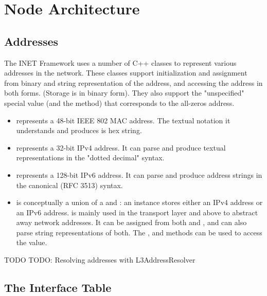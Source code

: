 \chapter{Node Architecture}
\label{cha:node-architecture}

\section{Addresses}

The INET Framework uses a number of C++ classes to represent various
addresses in the network. These classes support initialization and
assignment from binary and string representation of the address, and
accessing the address in both forms. (Storage is in binary form). They also
support the "unspecified" special value (and the 
method) that corresponds to the all-zeros address.

\begin{itemize}
  \item {} represents a 48-bit IEEE 802 MAC address. The
    textual notation it understands and produces is hex string.

  \item {} represents a 32-bit IPv4 address. It can parse
    and produce textual representations in the "dotted decimal" syntax.

  \item {} represents a 128-bit IPv6 address. It can parse
    and produce address strings in the canonical (RFC 3513) syntax.

  \item {} is conceptually a union of a 
    and : an instance stores either an IPv4 address or an
    IPv6 address.  is mainly used in the transport layer and above
    to abstract away network addresses. It can be assigned from both 
    and , and can also parse string representations of both.
    The ,  and  methods can be used
    to access the value.
\end{itemize}

\ifdraft TODO
TODO: Resolving addresses with L3AddressResolver
\fi

\section{The Interface Table}


